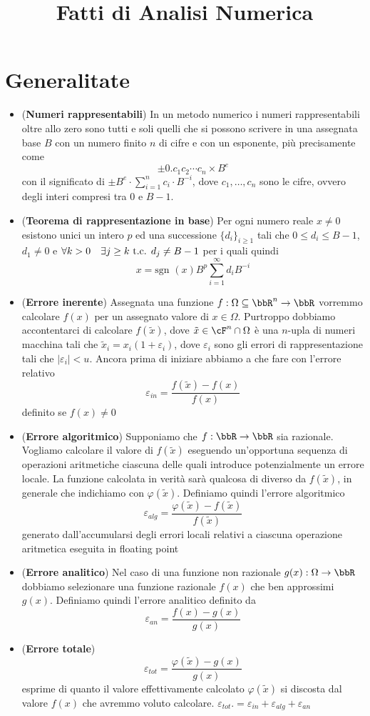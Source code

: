 \documentclass[a4paper,NoNotes,GeneralMath]{stdmdoc}
\newcommand{\sgn}{\text{sgn }}
\begin{document}
	\title{Fatti di Analisi Numerica}
	
	\section*{Generalitate}
	\begin{itemize}
		\item ({\bf Numeri rappresentabili}) In un metodo numerico i numeri rappresentabili oltre allo zero sono tutti e soli quelli che si possono scrivere in una assegnata base $B$ con un numero finito $n$ di cifre e con un esponente, più precisamente come $$ \pm 0.c_1 c_2 \cdots c_n \times B^e $$ con il significato di $\pm B^e \cdot \sum_{i=1}^{n} c_i \cdot B^{-i}$, dove $c_1, \ldots, c_n$ sono le cifre, ovvero degli interi compresi tra $0$ e $B-1$.
		\item ({\bf Teorema di rappresentazione in base}) Per ogni numero reale $x \neq 0$ esistono unici un intero $p$ ed una successione $\{d_i\}_{i \ge 1}$ tali che $0 \le d_i \le B-1$, $d_1 \neq 0$ e $\forall k > 0 \quad \exists j \ge k \mbox{ t.c. } d_j \neq B-1$ per i quali quindi $$ x = \sgn(x) B^p \sum_{i=1}^{\infty} d_i B^{-i} $$
		\item ({\bf Errore inerente}) Assegnata una funzione $f: \Omega \subseteq \bbR^n \rar \bbR$ vorremmo calcolare $f(x)$ per un assegnato valore di $x \in \Omega$. Purtroppo dobbiamo accontentarci di calcolare $f(\tilde{x})$, dove $\tilde{x} \in \cF^n \cap \Omega$ è una $n$-upla di numeri macchina tali che $\tilde{x}_i = x_i (1 + \varepsilon_i)$, dove $\varepsilon_i$ sono gli errori di rappresentazione tali che $\mid \varepsilon_i \mid < u$. Ancora prima di iniziare abbiamo a che fare con l'errore relativo $$ \varepsilon_{in} = \frac{f(\tilde x) - f(x)}{f(x)} $$ definito se $f(x) \neq 0$
		\item ({\bf Errore algoritmico}) Supponiamo che $f: \bbR \rar \bbR$ sia razionale. Vogliamo calcolare il valore di $f(\tilde x)$ eseguendo un'opportuna sequenza di operazioni aritmetiche ciascuna delle quali introduce potenzialmente un errore locale. La funzione calcolata in verità sarà qualcosa di diverso da $f(\tilde x)$, in generale che indichiamo con $\varphi(\tilde x)$. Definiamo quindi l'errore algoritmico $$ \varepsilon_{alg} = \frac{\varphi(\tilde x) - f(\tilde x)}{f(\tilde x)} $$ generato dall'accumularsi degli errori locali relativi a ciascuna operazione aritmetica eseguita in floating point
		\item ({\bf Errore analitico}) Nel caso di una funzione non razionale $g(x): \Omega \rar \bbR$ dobbiamo selezionare una funzione razionale $f(x)$ che ben approssimi $g(x)$. Definiamo quindi l'errore analitico definito da $$ \varepsilon_{an} = \frac{f(x) - g(x)}{g(x)} $$
		\item ({\bf Errore totale}) $$ \varepsilon_{tot} = \frac{\varphi(\tilde x) - g(x)}{g(x)} $$ esprime di quanto il valore effettivamente calcolato $\varphi(\tilde x)$ si discosta dal valore $f(x)$ che avremmo voluto calcolare. $\varepsilon_{tot} .= \varepsilon_{in} + \varepsilon_{alg} + \varepsilon_{an}$
	\end{itemize}
\end{document}
